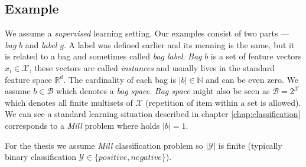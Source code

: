 \subsection*{Example}
We assume a \emph{supervised} learning setting. Our examples consist of two parts --- \emph{bag} $b$ and \emph{label} $y$. A label was defined earlier and its meaning is the same, but it is related to a bag and sometimes called \emph{bag label}. \emph{Bag} $b$ is a set of feature vectors $x_i\in\mathcal{X}$, these vectors are called \emph{instances} and usually lives in the standard feature space $\mathbb{R}^{d}$. The cardinality of each bag is $|b| \in \mathbb{N}$ and can be even zero. We assume $b \in \mathcal{B}$ which denotes a \emph{bag space}. \emph{Bag space} might also be seen as $\mathcal{B} = 2^{\mathcal{X}}$ which denotes all finite multisets of $\mathcal{X}$ (repetition of item within a set is allowed). We can see a standard learning situation described in chapter \ref{chap:classification} corresponds to a \emph{Mill} problem where holds $|b| = 1$.

For the thesis we assume \emph{Mill} classification problem so $|\mathcal{Y}|$ is finite (typically binary classification $\mathcal{Y} \in \{positive, negative\}$). 

